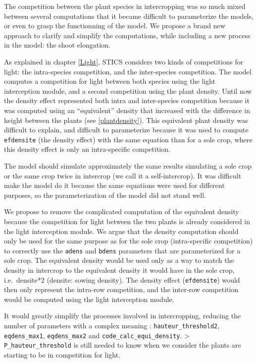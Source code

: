 \documentclass[
]{book}
\begin{document}
The competition between the plant species in intercropping was so much mixed between several computations that it became difficult to parameterize the models, or even to grasp the functionning of the model. We propose a brand new approach to clarify and simplify the computations, while including a new process in the model: the shoot elongation.

As explained in chapter \ref{Light}, STICS considers two kinds of competitions for light: the intra-species competition, and the inter-species competition. The model computes a competition for light between both species using the light interception module, and a second competition using the plant density. Until now the density effect represented both intra and inter-species competition because it was computed using an ``equivalent'' density that increased with the difference in height between the plants (see \ref{plantdensity}). This equivalent plant density was difficult to explain, and difficult to parameterize because it was used to compute \texttt{efdensite} (the density effect) with the same equation than for a sole crop, where this density effect is only an intra-specific competition.

The model should simulate approximately the same results simulating a sole crop or the same crop twice in intercrop (we call it a self-intercrop). It was difficult make the model do it because the same equations were used for different purposes, so the parameterization of the model did not stand well.

We propose to remove the complicated computation of the equivalent density because the competition for light between the two plants is already considered in the light interception module. We argue that the density computation should only be used for the same purpose as for the sole crop (intra-specific competition) to correctly use the \texttt{adens} and \texttt{bdens} parameters that are parameterized for a sole crop. The equivalent density would be used only as a way to match the density in intercrop to the equivalent density it would have in the sole crop, i.e.~densite*2 (densite: sowing density). The density effect (\texttt{efdensite}) would then only represent the intra-row competition, and the inter-row competition would be computed using the light interception module.

It would greatly simplify the processes involved in intercropping, reducing the number of parameters with a complex meaning : \texttt{hauteur\_threshold2}, \texttt{eqdens\_max1}, \texttt{eqdens\_max2} and \texttt{code\_calc\_equi\_density}.
\textgreater{} \texttt{P\_hauteur\_threshold} is still needed to know when we consider the plants are starting to be in competition for light.
\end{document}
